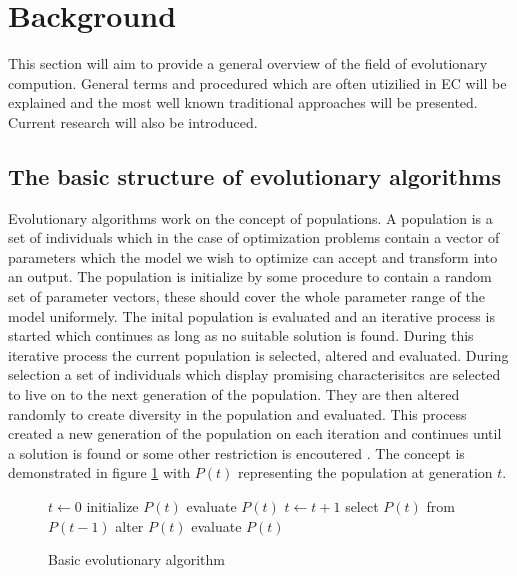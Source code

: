 \section{Background}

This section will aim to provide a general overview of the field of evolutionary compution. General terms and procedured which are often utizilied in EC will be explained and the most well known traditional approaches will be presented. Current research will also be introduced. %

\subsection{The basic structure of evolutionary algorithms}

Evolutionary algorithms work on the concept of populations. A population is a set of individuals which in the case of optimization problems contain a vector of parameters which the model we wish to optimize can accept and transform into an output. The population is initialize by some procedure to contain a random set of parameter vectors, these should cover the whole parameter range of the model uniformely. The inital population is evaluated and an iterative process is started which continues as long as no suitable solution is found. During this iterative process the current population is selected, altered and evaluated. During selection a set of individuals which display promising characterisitcs are selected to live on to the next generation of the population. They are then altered randomly to create diversity in the population and evaluated. This process created a new generation of the population on each iteration and continues until a solution is found or some other restriction is encoutered \cite{Eiben20021}. The concept is demonstrated in figure \ref{algo:basicevolution} with $P(t)$ representing the population at generation $t$.

\begin{figure}[h]
  \centering
  \begin{minipage}{7.5cm}
    \begin{algorithmic}
       \State $t\gets 0$
       \State initialize $P(t)$
       \State evaluate $P(t)$
        \State $t\gets t + 1$
        \State select $P(t)$ from $P(t-1)$
        \State alter $P(t)$
        \State evaluate $P(t)$
       \EndWhile
    \end{algorithmic}
  \end{minipage}
  \caption{Basic evolutionary algorithm}
  \label{algo:basicevolution}
\end{figure}

